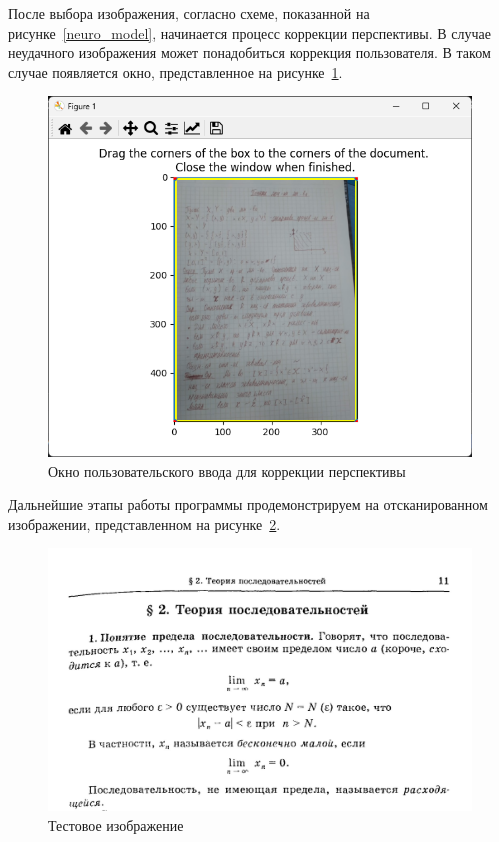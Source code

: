 После выбора изображения, согласно схеме, показанной на рисунке~\ref{neuro_model}, начинается процесс коррекции перспективы. В случае неудачного изображения может понадобиться коррекция пользователя. В таком случае появляется окно, представленное на рисунке~\ref{perspective_correction_window}.

\begin{figure}
    \includegraphics[scale=0.75]{img/app/perspective_correction_window.png}
    \caption{Окно пользовательского ввода для коррекции перспективы}
    \label{perspective_correction_window}
\end{figure}

Дальнейшие этапы работы программы продемонстрируем на отсканированном изображении, представленном на рисунке~\ref{test_input}.

\begin{figure}
    \includegraphics[scale=0.75]{img/app/input_image.jpg}
    \caption{Тестовое изображение}
    \label{test_input}
\end{figure}

